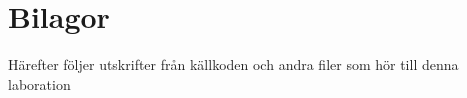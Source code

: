 \documentclass[titlepage, twocolumn, a4paper, 10pt]{article}
\begin{document}






\newpage
\appendix
{}
\section{Bilagor}\label{sec:kallkod}
Härefter följer utskrifter från källkoden och andra filer som hör till
denna laboration
\end{document}
